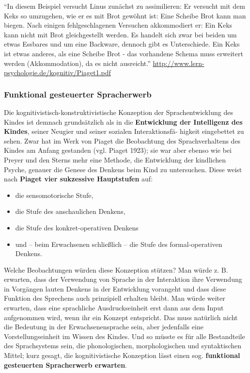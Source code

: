 \documentclass[
  letterpaper,
]{scrbook}
\begin{document}
``In diesem Beispiel versucht Linus zunächst zu assimilieren: Er
versucht mit dem Keks so umzugehen, wie er es mit Brot gewöhnt ist: Eine
Scheibe Brot kann man biegen. Nach einigen fehlgeschlagenen Versuchen
akkommodiert er: Ein Keks kann nicht mit Brot gleichgestellt werden. Es
handelt sich zwar bei beiden um etwas Essbares und um eine Backware,
dennoch gibt es Unterschiede. Ein Keks ist etwas anderes, als eine
Scheibe Brot - das vorhandene Schema muss erweitert werden
(Akkommodation), da es nicht ausreicht.''
\url{http://www.lern-psychologie.de/kognitiv/Piaget1.pdf}

\hypertarget{funktional-gesteuerter-spracherwerb}{%
\subsubsection{Funktional gesteuerter
Spracherwerb}\label{funktional-gesteuerter-spracherwerb}}

Die kognitivistisch-konstruktivistische Konzeption der Sprachentwicklung
des Kindes ist demnach grundsätzlich als in die \textbf{Entwicklung der
Intelligenz des Kindes}, seiner Neugier und seiner sozialen
Interaktionsfä- higkeit eingebettet zu sehen. Zwar hat im Werk von
Piaget die Beobachtung des Sprachverhaltens des Kindes am Anfang
gestanden (vgl. Piaget 1923); sie war aber ebenso wie bei Preyer und den
Sterns mehr eine Methode, die Entwicklung der kindlichen Psyche, genauer
die Genese des Denkens beim Kind zu untersuchen. Diese weist nach
\textbf{Piaget vier sukzessive Hauptstufen} auf:

\begin{itemize}
\item
  die sensomotorische Stufe,
\item
  die Stufe des anschaulichen Denkens,
\item
  die Stufe des konkret-operativen Denkens
\item
  und -- beim Erwachsenen schließlich -- die Stufe des formal-operativen
  Denkens.
\end{itemize}

Welche Beobachtungen würden diese Konzeption stützen? Man würde z. B.
erwarten, dass der Verwendung von Sprache in der Interaktion ihre
Verwendung in Vorgängen lauten Denkens in der Entwicklung vorangeht und
dass diese Funktion des Sprechens auch prinzipiell erhalten bleibt. Man
würde weiter erwarten, dass eine sprachliche Ausdruckseinheit erst dann
aus dem Input aufgenommen wird, wenn ihr ein Konzept entspricht. Das
muss natürlich nicht die Bedeutung in der Erwachsenensprache sein, aber
jedenfalls eine Vorstellungseinheit im Wissen des Kindes. Und so müsste
es für alle Bestandteile des Sprachsystems sein, die phonologischen,
morphologischen und syntaktischen Mittel; kurz gesagt, die
kognitivistische Konzeption lässt einen sog. \textbf{funktional
gesteuerten Spracherwerb erwarten}.
\end{document}
